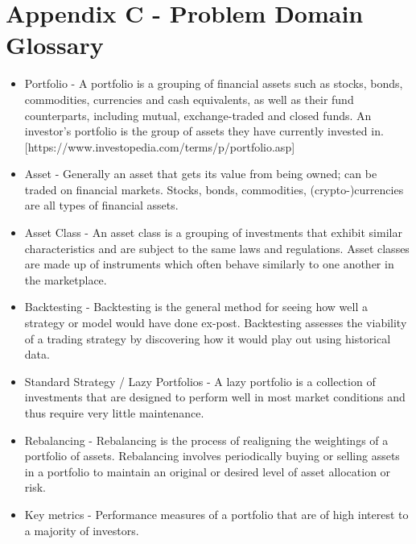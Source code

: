 \documentclass[main.tex]{subfiles}
\begin{document}
\section{Appendix C - Problem Domain Glossary}
\label{domain_glossary}
\begin{itemize}
    \item Portfolio - A portfolio is a grouping of financial assets such as stocks, bonds, commodities, currencies and cash equivalents, as well as their fund counterparts, including mutual, exchange-traded and closed funds. An investor's portfolio is the group of assets they have currently invested in. [https://www.investopedia.com/terms/p/portfolio.asp]
    \item Asset - Generally an asset that gets its value from being owned; can be traded on financial markets. Stocks, bonds, commodities, (crypto-)currencies are all types of financial assets. 
    \item Asset Class - An asset class is a grouping of investments that exhibit similar
characteristics and are subject to the same laws and regulations. Asset
classes are made up of instruments which often behave similarly to one
another in the marketplace. 
    \item Backtesting - Backtesting is the general method for seeing how well a strategy or
model would have done ex-post. Backtesting assesses the viability of a trading strategy by discovering how it would play out using historical data.
    \item Standard Strategy / Lazy Portfolios - A lazy portfolio is a collection of investments that are designed to perform well in most market conditions and thus require very little maintenance.
    \item Rebalancing - Rebalancing is the process of realigning the weightings of a portfolio of assets. Rebalancing involves periodically buying or selling assets in a portfolio to maintain an original or desired level of asset allocation or risk. 
    \item Key metrics - Performance measures of a portfolio that are of high interest to a majority of investors.

\end{itemize}
\end{document}
